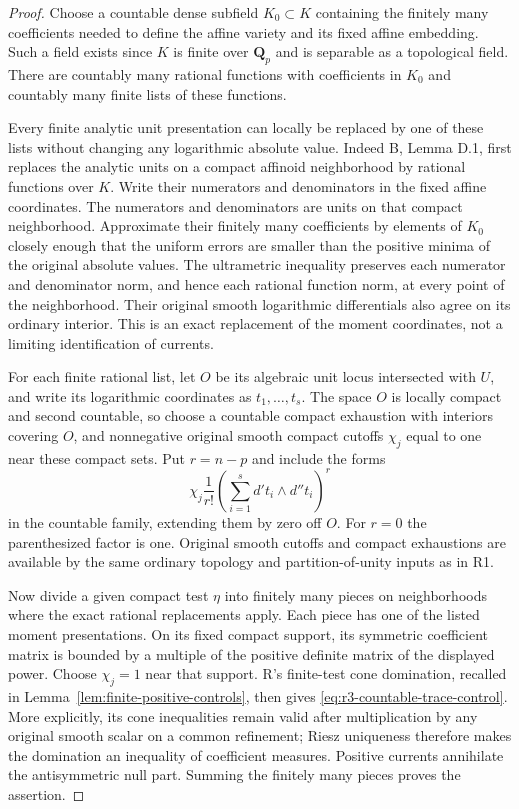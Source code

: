 \documentclass[11pt,a4paper]{article}
\numberwithin{equation}{section}
\theoremstyle{definition}
\theoremstyle{remark}
\begin{document}
\begin{proof}
Choose a countable dense subfield $K_0\subset K$ containing the
finitely many coefficients needed to define the affine variety
and its fixed affine embedding. Such a field exists since $K$ is
finite over $\mathbf Q_p$ and is separable as a topological field.
There are countably many rational functions with coefficients
in $K_0$ and countably many finite lists of these functions.

Every finite analytic unit presentation can locally be replaced
by one of these lists without changing any logarithmic absolute
value. Indeed B, Lemma D.1, first replaces the analytic units
on a compact affinoid neighborhood by rational functions over
$K$. Write their numerators and denominators in the fixed
affine coordinates. The numerators and denominators are units
on that compact neighborhood. Approximate their finitely many
coefficients by elements of $K_0$ closely enough that the
uniform errors are smaller than the positive minima of the
original absolute values. The ultrametric inequality preserves
each numerator and denominator norm, and hence each rational
function norm, at every point of the neighborhood. Their
original smooth logarithmic differentials also agree on its
ordinary interior. This is an exact replacement of the moment
coordinates, not a limiting identification of currents.

For each finite rational list, let $O$ be its algebraic unit
locus intersected with $U$, and write its logarithmic
coordinates as $t_1,\ldots,t_s$. The space $O$ is locally
compact and second countable, so choose a countable compact
exhaustion with interiors covering $O$, and nonnegative
original smooth compact cutoffs $\chi_j$ equal to one near
these compact sets. Put $r=n-p$ and include the forms
\[
 \chi_j\frac1{r!}
       \left(\sum_{i=1}^s d't_i\wedge d''t_i\right)^r
\]
in the countable family, extending them by zero off $O$.
For $r=0$ the parenthesized factor is one. Original smooth
cutoffs and compact exhaustions are available by the same
ordinary topology and partition-of-unity inputs as in R1.

Now divide a given compact test $\eta$ into finitely many
pieces on neighborhoods where the exact rational replacements
apply. Each piece has one of the listed moment presentations.
On its fixed compact support, its symmetric coefficient
matrix is bounded by a multiple of the positive definite
matrix of the displayed power. Choose $\chi_j=1$ near that
support. R's finite-test cone domination, recalled in
Lemma~\ref{lem:finite-positive-controls}, then gives
\eqref{eq:r3-countable-trace-control}. More explicitly, its
cone inequalities remain valid after multiplication by any
original smooth scalar on a common refinement; Riesz
uniqueness therefore makes the domination an inequality of
coefficient measures. Positive currents annihilate the
antisymmetric null part. Summing the finitely many pieces
proves the assertion.
\end{proof}
\end{document}
